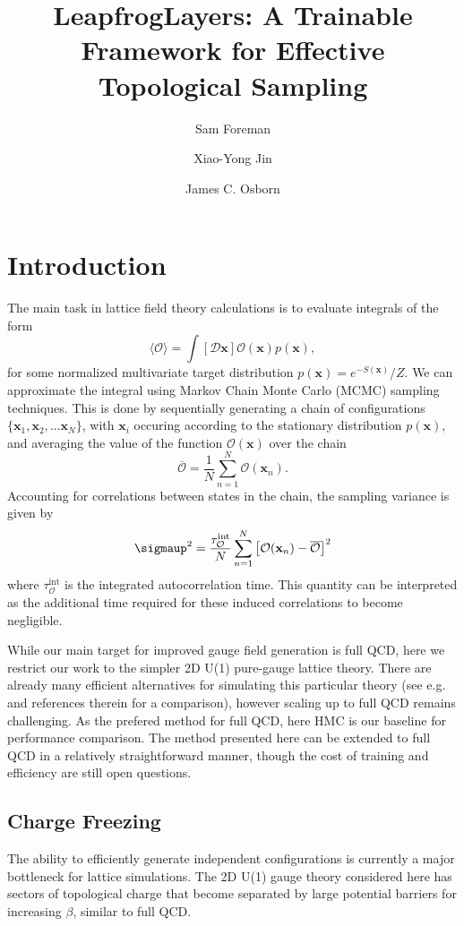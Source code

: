 \documentclass[a4paper,11pt]{article}
\title{LeapfrogLayers: A Trainable Framework for Effective Topological Sampling}
\author*[a]{Sam Foreman}
\author[a,b]{Xiao-Yong Jin}
\author[a,b]{James C. Osborn}
\affiliation[a]{Leadership Computing Facility, Argonne National Laboratory,\\
  Lemont, IL, USA}
\affiliation[b]{Computational Science Division, Argonne National Laboratory,\\
  Lemont, IL, USA}
\newcommand{\x}{\mathbf{x}}
\begin{document}
\maketitle


\section{\label{sec:intro}Introduction}
%
The main task in lattice field theory calculations is to evaluate
integrals of the form
%
\begin{equation}
  \langle \mathcal{O} \rangle =
  \int \left[ \mathcal{D} \x \right] \mathcal{O}(\x) p(\x),
    \label{eq:density_integral}
\end{equation}
%
for some normalized multivariate target distribution \(p(\x) = e^{-S(\x)}/Z\).
%
We can approximate the integral using Markov Chain Monte Carlo (MCMC) sampling
techniques.
%
This is done by sequentially generating a chain of configurations \(\{\x_{1},
\x_{2}, \ldots \x_{N}\}\), with \(\x_{i}\) occuring according to the stationary distribution \(p(\x)\), and averaging the value of
the function \(\mathcal{O}(\x)\) over the chain
\begin{equation}
  \overline{\mathcal{O}} = \frac{1}{N} \sum_{n=1}^{N} \mathcal{O}(\x_n)  .
\end{equation}
%
Accounting for correlations between states in the chain, the sampling variance
is given by
%
\begin{equation}
  \sigmaup^{2} = \frac{\tau_{\mathcal{O}}^{\mathrm{int}}}{N}\sum_{n=1}^{N}
  \left[ \mathcal{O}(\x_n) - \overline{\mathcal{O}} \right]^2
\end{equation}
%
where \(\tau^{\mathrm{int}}_{\mathcal{O}}\) is the integrated autocorrelation
time.
%
This quantity can be interpreted as the additional time required for
these induced correlations to become negligible.

While our main target for improved gauge field generation is full QCD,
here we restrict our work to the simpler 2D U(1) pure-gauge lattice
theory.
There are already many efficient alternatives for simulating this particular theory
(see e.g.~\cite{Eichhorn:2021ccz} and references therein for a comparison),
however scaling up to full QCD remains challenging.
%
As the prefered method for full QCD,
here HMC is our baseline for performance comparison.
%
The method presented here can be extended to full QCD in a relatively
straightforward manner, though the cost of training and efficiency are
still open questions.
%
\subsection{\label{subsec:qfreezing}Charge Freezing}
%
The ability to efficiently generate independent configurations is currently
a major bottleneck for lattice simulations.
%
The 2D U(1) gauge theory considered here has sectors of topological charge that
become separated by large potential barriers for increasing $\beta$,
similar to full QCD.
\end{document}
